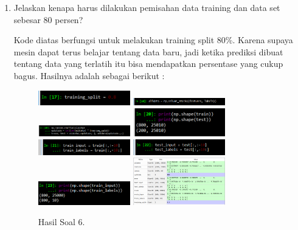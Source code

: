 \begin{enumerate}
	\item Jelaskan kenapa harus dilakukan pemisahan data training dan data set sebesar 80 persen? 
	\hfill\break
	
	Kode diatas berfungsi untuk melakukan training split 80\%. Karena supaya mesin dapat terus belajar tentang data baru, jadi ketika prediksi dibuat tentang data yang terlatih itu bisa mendapatkan persentase yang cukup bagus. Hasilnya adalah sebagai berikut :
	\begin{figure}[H]
	\centering
		\includegraphics[width=4cm]{figures/1174096/tugas6/hasil6_1.PNG}
		\includegraphics[width=4cm]{figures/1174096/tugas6/hasil6_2.PNG}
		\includegraphics[width=4cm]{figures/1174096/tugas6/hasil6_3.PNG}
		\includegraphics[width=4cm]{figures/1174096/tugas6/hasil6_4.PNG}
		\includegraphics[width=4cm]{figures/1174096/tugas6/hasil6_5.PNG}
		\includegraphics[width=4cm]{figures/1174096/tugas6/hasil6_6.PNG}
		\includegraphics[width=4cm]{figures/1174096/tugas6/hasil6_7.PNG}
		\includegraphics[width=4cm]{figures/1174096/tugas6/hasil6_8.PNG}
		\caption{Hasil Soal 6.}
	\end{figure}


\end{enumerate}
